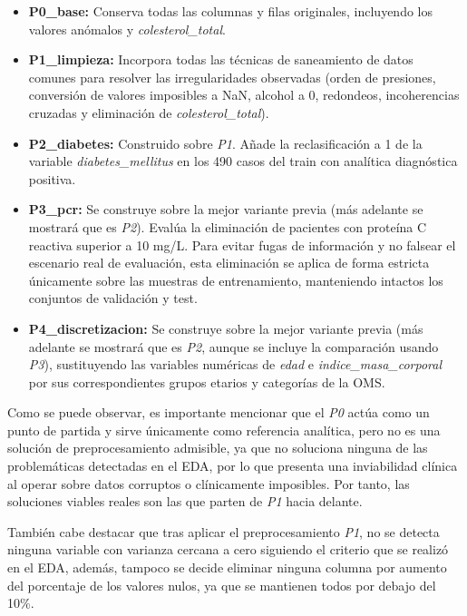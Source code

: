 \documentclass[journal,onecolumn]{IEEEtran}
\begin{document}
\begin{itemize}
    \item \textbf{P0\_base:} Conserva todas las columnas y filas originales, incluyendo los valores anómalos y \textit{colesterol\_total}.
    
    \item \textbf{P1\_limpieza:} Incorpora todas las técnicas de saneamiento de datos comunes para resolver las irregularidades observadas (orden de presiones, conversión de valores imposibles a NaN, alcohol a 0, redondeos, incoherencias cruzadas y eliminación de \textit{colesterol\_total}).
    
    \item \textbf{P2\_diabetes:} Construido sobre \textit{P1}. Añade la reclasificación a 1 de la variable \textit{diabetes\_mellitus} en los 490 casos del train con analítica diagnóstica positiva.
    
    \item \textbf{P3\_pcr:} Se construye sobre la mejor variante previa (más adelante se mostrará que es \textit{P2}). Evalúa la eliminación de pacientes con proteína C reactiva superior a 10 mg/L. Para evitar fugas de información y no falsear el escenario real de evaluación, esta eliminación se aplica de forma estricta únicamente sobre las muestras de entrenamiento, manteniendo intactos los conjuntos de validación y test.
    
    \item \textbf{P4\_discretizacion:} Se construye sobre la mejor variante previa (más adelante se mostrará que es \textit{P2}, aunque se incluye la comparación usando \textit{P3}), sustituyendo las variables numéricas de \textit{edad} e \textit{indice\_masa\_corporal} por sus correspondientes grupos etarios y categorías de la OMS.
\end{itemize}

Como se puede observar, es importante mencionar que el \textit{P0} actúa como un punto de partida y sirve únicamente como referencia analítica, pero no es una solución de preprocesamiento admisible, ya que no soluciona ninguna de las problemáticas detectadas en el EDA, por lo que presenta una inviabilidad clínica al operar sobre datos corruptos o clínicamente imposibles. Por tanto, las soluciones viables reales son las que parten de \textit{P1} hacia delante.

También cabe destacar que tras aplicar el preprocesamiento \textit{P1}, no se detecta ninguna variable con varianza cercana a cero siguiendo el criterio que se realizó en el EDA, además, tampoco se decide eliminar ninguna columna por aumento del porcentaje de los valores nulos, ya que se mantienen todos por debajo del 10\%. 
\end{document}
